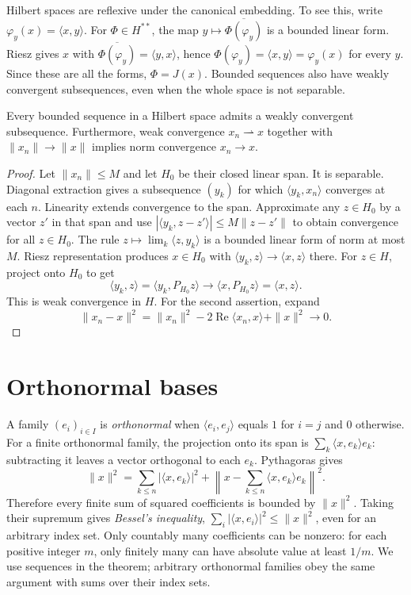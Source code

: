Hilbert spaces are reflexive under the canonical embedding. To see this, write $\varphi_y(x)=\langle x,y\rangle$. For $\Phi\in H^{**}$, the map $y\mapsto\overline{\Phi(\varphi_y)}$ is a bounded linear form. Riesz gives $x$ with $\overline{\Phi(\varphi_y)}=\langle y,x\rangle$, hence $\Phi(\varphi_y)=\langle x,y\rangle=\varphi_y(x)$ for every $y$. Since these are all the forms, $\Phi=J(x)$. Bounded sequences also have weakly convergent subsequences, even when the whole space is not separable.

\begin{corollary}\label{cor:weakcompact}
Every bounded sequence in a Hilbert space admits a weakly convergent subsequence. Furthermore, weak convergence $x_n\rightharpoonup x$ together with $\|x_n\|\to\|x\|$ implies norm convergence $x_n\to x$.
\end{corollary}
\begin{proof}
Let $\|x_n\|\le M$ and let $H_0$ be their closed linear span. It is separable. Diagonal extraction gives a subsequence $(y_k)$ for which $\langle y_k,x_n\rangle$ converges at each $n$. Linearity extends convergence to the span. Approximate any $z\in H_0$ by a vector $z'$ in that span and use $|\langle y_k,z-z'\rangle|\le M\|z-z'\|$ to obtain convergence for all $z\in H_0$. The rule $z\mapsto\lim_k\langle z,y_k\rangle$ is a bounded linear form of norm at most $M$. Riesz representation produces $x\in H_0$ with $\langle y_k,z\rangle\to\langle x,z\rangle$ there. For $z\in H$, project onto $H_0$ to get
\[\langle y_k,z\rangle=\langle y_k,P_{H_0}z\rangle\longrightarrow\langle x,P_{H_0}z\rangle=\langle x,z\rangle.\]
This is weak convergence in $H$. For the second assertion, expand
\[\|x_n-x\|^2=\|x_n\|^2-2\operatorname{Re}\langle x_n,x\rangle+\|x\|^2\longrightarrow0.\]
\end{proof}

\section{Orthonormal bases}

A family $(e_i)_{i\in I}$ is \emph{orthonormal} when $\langle e_i,e_j\rangle$ equals $1$ for $i=j$ and $0$ otherwise. For a finite orthonormal family, the projection onto its span is $\sum_k\langle x,e_k\rangle e_k$: subtracting it leaves a vector orthogonal to each $e_k$. Pythagoras gives
\[\|x\|^2=\sum_{k\le n}|\langle x,e_k\rangle|^2+\left\|x-\sum_{k\le n}\langle x,e_k\rangle e_k\right\|^2.\]
Therefore every finite sum of squared coefficients is bounded by $\|x\|^2$. Taking their supremum gives \emph{Bessel's inequality}, $\sum_i|\langle x,e_i\rangle|^2\le\|x\|^2$, even for an arbitrary index set. Only countably many coefficients can be nonzero: for each positive integer $m$, only finitely many can have absolute value at least $1/m$. We use sequences in the theorem; arbitrary orthonormal families obey the same argument with sums over their index sets.

